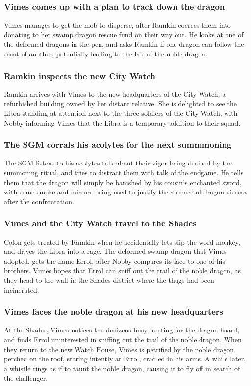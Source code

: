 \subsubsection{\Gls{Vimes} comes up with a plan to track down the dragon}
\Gls{Vimes} manages to get the mob to disperse, after \Gls{Ramkin} coerces them into donating to her
swamp dragon rescue fund on their way out. He looks at one of the deformed dragons in the pen, and
asks \Gls{Ramkin} if one dragon can follow the scent of another, potentially leading to the lair of
the noble dragon.

\subsubsection{\Gls{Ramkin} inspects the new City Watch}
\Gls{Ramkin} arrives with \Gls{Vimes} to the new headquarters of the City Watch, a refurbished
building owned by her distant relative. She is delighted to see the \Gls{Libra} standing at
attention next to the three soldiers of the City Watch, with \Gls{Nobby} informing \Gls{Vimes} that
the \Gls{Libra} is a temporary addition to their squad.

\subsubsection{The \Gls{SGM} corrals his acolytes for the next summmoning}
The \Gls{SGM} listens to his acolytes talk about their vigor being drained by the summoning ritual,
and tries to distract them with talk of the endgame. He tells them that the dragon will simply be
banished by his cousin's enchanted sword, with some smoke and mirrors being used to justify the
absence of dragon viscera after the confrontation.

\subsubsection{\Gls{Vimes} and the City Watch travel to the Shades}
\Gls{Colon} gets treated by \Gls{Ramkin} when he accidentally lets slip the word monkey, and drives
the \Gls{Libra} into a rage. The deformed swamp dragon that \Gls{Vimes} adopted, gets the name
\Gls{Errol}, after \Gls{Nobby} compares its face to one of his brothers. \Gls{Vimes} hopes that
\Gls{Errol} can sniff out the trail of the noble dragon, as they head to the wall in the Shades
district where the thugs had been incinerated.

\subsubsection{\Gls{Vimes} faces the noble dragon at his new headquarters}
At the Shades, \Gls{Vimes} notices the denizens busy hunting for the dragon-hoard, and finds
\Gls{Errol} uninterested in sniffing out the trail of the noble dragon. When they return to the
new Watch House, \Gls{Vimes} is petrified by the noble dragon perched on the roof, staring intently
at \Gls{Errol}, cradled in his arms. A while later, a whistle rings as if to taunt the noble
dragon, causing it to fly off in search of the challenger.

